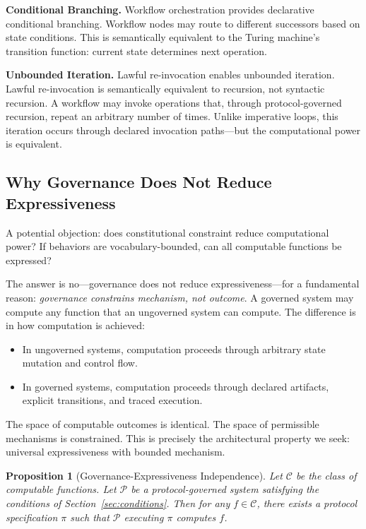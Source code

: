 \documentclass[11pt,a4paper]{article}
\newtheorem{proposition}{Proposition}
\begin{document}
\textbf{Conditional Branching.} Workflow orchestration provides declarative conditional branching. Workflow nodes may route to different successors based on state conditions. This is semantically equivalent to the Turing machine's transition function: current state determines next operation.

\textbf{Unbounded Iteration.} Lawful re-invocation enables unbounded iteration. Lawful re-invocation is semantically equivalent to recursion, not syntactic recursion. A workflow may invoke operations that, through protocol-governed recursion, repeat an arbitrary number of times. Unlike imperative loops, this iteration occurs through declared invocation paths---but the computational power is equivalent.

\subsection{Why Governance Does Not Reduce Expressiveness}

A potential objection: does constitutional constraint reduce computational power? If behaviors are vocabulary-bounded, can all computable functions be expressed?

The answer is no---governance does not reduce expressiveness---for a fundamental reason: \emph{governance constrains mechanism, not outcome}. A governed system may compute any function that an ungoverned system can compute. The difference is in how computation is achieved:

\begin{itemize}[nosep]
    \item In ungoverned systems, computation proceeds through arbitrary state mutation and control flow.
    \item In governed systems, computation proceeds through declared artifacts, explicit transitions, and traced execution.
\end{itemize}

The space of computable outcomes is identical. The space of permissible mechanisms is constrained. This is precisely the architectural property we seek: universal expressiveness with bounded mechanism.

\begin{proposition}[Governance-Expressiveness Independence]
Let $\mathcal{C}$ be the class of computable functions. Let $\mathcal{P}$ be a protocol-governed system satisfying the conditions of Section~\ref{sec:conditions}. Then for any $f \in \mathcal{C}$, there exists a protocol specification $\pi$ such that $\mathcal{P}$ executing $\pi$ computes $f$.
\end{proposition}
\end{document}

